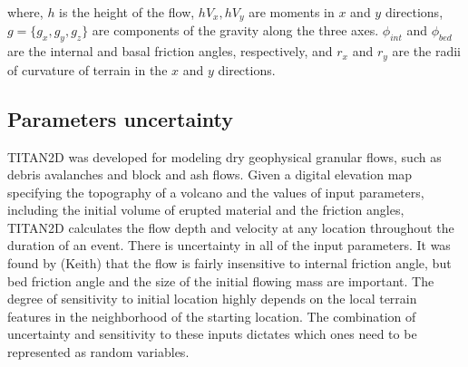 \documentclass{article}
\begin{document}
where, $h$ is the height of the flow, $hV_x, hV_y$ are moments in $x$ and $y$ directions, $g = \{g_x,g_y,g_z\}$ are
components of the gravity along the three axes. $\phi_{int}$ and $\phi_{bed}$ are the internal and basal friction angles,
respectively, and $r_x$ and $r_y$ are the radii of curvature of terrain in the $x$ and $y$ directions.

\subsection{Parameters uncertainty}
TITAN2D was developed for modeling dry geophysical granular flows,
such as debris avalanches and block and ash flows.  Given a digital
elevation map specifying the topography of a volcano and the values of
input parameters, including the initial volume of erupted material and
the friction angles, TITAN2D calculates the flow depth and velocity at
any location throughout the duration of an event. There is uncertainty 
in all of the input parameters. It was found by (Keith) that the flow is fairly
insensitive to internal friction angle, but bed friction angle and the size of the
initial flowing mass are important. The degree of sensitivity to initial location
highly depends on the local terrain features in the neighborhood of the
starting location. The combination of uncertainty and sensitivity to these
inputs dictates which ones need to be represented as random variables.
\end{document}
